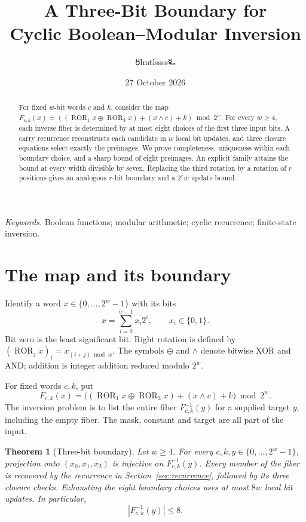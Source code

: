 \documentclass[11pt,a4paper]{article}
\title{\LARGE A Three-Bit Boundary for\\Cyclic Boolean--Modular Inversion}
\author{{\authorsymbol 🜘}lmtlssss{\authorsymbol 🜐}}
\date{27 October 2026}
\newtheorem{theorem}{Theorem}
\newcommand{\B}{\{0,1\}}
\newcommand{\xor}{\mathbin{\oplus}}
\DeclareMathOperator{\ROR}{ROR}
\begin{document}
\maketitle\thispagestyle{plain}
\begin{abstract}
For fixed $w$-bit words $c$ and $k$, consider the map
$F_{c,k}(x)=((\ROR_1x\xor\ROR_3x)+(x\land c)+k)\bmod 2^w$.
For every $w\ge4$, each inverse fiber is determined by at most eight choices of the first three input bits. A carry recurrence reconstructs each candidate in $w$ local bit updates, and three closure equations select exactly the preimages. We prove completeness, uniqueness within each boundary choice, and a sharp bound of eight preimages. An explicit family attains the bound at every width divisible by seven. Replacing the third rotation by a rotation of $r$ positions gives an analogous $r$-bit boundary and a $2^r w$ update bound.
\end{abstract}
\noindent\textit{Keywords.} Boolean functions; modular arithmetic; cyclic recurrence; finite-state inversion.

\section{The map and its boundary}
Identify a word $x\in\{0,\ldots,2^w-1\}$ with its bits
\[
 x=\sum_{i=0}^{w-1}x_i2^i,\qquad x_i\in\B.
\]
Bit zero is the least significant bit. Right rotation is defined by
$(\ROR_jx)_i=x_{(i+j)\bmod w}$. The symbols $\xor$ and $\land$ denote bitwise XOR and AND; addition is integer addition reduced modulo $2^w$.

For fixed words $c,k$, put
\begin{equation}\label{eq:map}
 F_{c,k}(x)=\bigl((\ROR_1x\xor\ROR_3x)+(x\land c)+k\bigr)\bmod 2^w.
\end{equation}
The inversion problem is to list the entire fiber $F_{c,k}^{-1}(y)$ for a supplied target $y$, including the empty fiber. The mask, constant and target are all part of the input.

\begin{theorem}[Three-bit boundary]\label{thm:main}
Let $w\ge4$. For every $c,k,y\in\{0,\ldots,2^w-1\}$, projection onto $(x_0,x_1,x_2)$ is injective on $F_{c,k}^{-1}(y)$. Every member of the fiber is recovered by the recurrence in Section~\ref{sec:recurrence}, followed by its three closure checks. Exhausting the eight boundary choices uses at most $8w$ local bit updates. In particular,
\begin{equation}\label{eq:bound}
 |F_{c,k}^{-1}(y)|\le8.
\end{equation}
\end{theorem}
\end{document}
